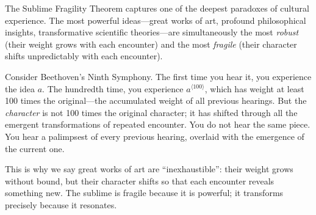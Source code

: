 \begin{interpretation}
\label{int:sublime-fragility}
The Sublime Fragility Theorem captures one of the deepest paradoxes of
cultural experience.  The most powerful ideas---great works of art, profound
philosophical insights, transformative scientific theories---are simultaneously
the most \emph{robust} (their weight grows with each encounter) and the most
\emph{fragile} (their character shifts unpredictably with each encounter).

Consider Beethoven's Ninth Symphony.  The first time you hear it, you
experience the idea $a$.  The hundredth time, you experience $a^{\langle 100
\rangle}$, which has weight at least 100 times the original---the accumulated
weight of all previous hearings.  But the \emph{character} is not 100 times
the original character; it has shifted through all the emergent transformations
of repeated encounter.  You do not hear the same piece.  You hear a
palimpsest of every previous hearing, overlaid with the emergence of the
current one.

This is why we say great works of art are ``inexhaustible'': their weight
grows without bound, but their character shifts so that each encounter
reveals something new.  The sublime is fragile because it is powerful;
it transforms precisely because it resonates.
\end{interpretation}

